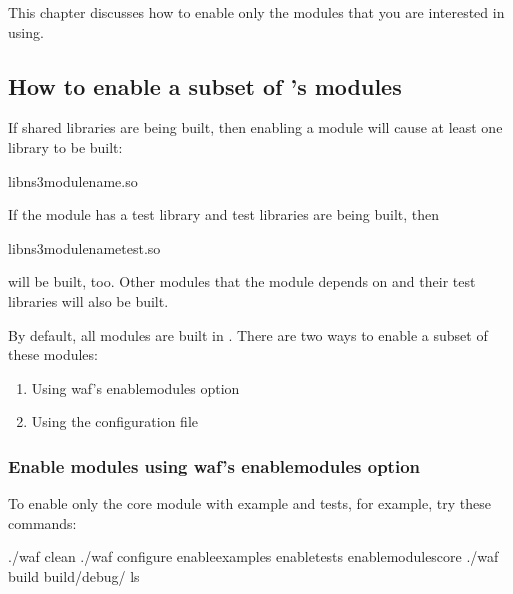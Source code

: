 \documentclass[letterpaper,10pt,english]{sphinxmanual}
\begin{document}
This chapter discusses how to enable only the  modules that you are interested in using.


\subsection{How to enable a subset of ’s modules}
\label{\detokenize{enable-modules:how-to-enable-a-subset-of-ns3-s-modules}}
If shared libraries are being built, then enabling a module will cause at least one library to be built:

\begin{sphinxVerbatim}[commandchars=\\\{\}]
libns3\PYGZhy{}modulename.so
\end{sphinxVerbatim}

If the module has a test library and test libraries are being built, then

\begin{sphinxVerbatim}[commandchars=\\\{\}]
libns3\PYGZhy{}modulename\PYGZhy{}test.so
\end{sphinxVerbatim}

will be built, too.  Other modules that the module depends on and their test libraries will also be built.

By default, all modules are built in .  There are two ways to enable a subset of these modules:
\begin{enumerate}
%
\item {} 
Using waf’s \textendash{}enable\sphinxhyphen{}modules option

\item {} 
Using the  configuration file

\end{enumerate}


\subsubsection{Enable modules using waf’s \textendash{}enable\sphinxhyphen{}modules option}
\label{\detokenize{enable-modules:enable-modules-using-waf-s-enable-modules-option}}
To enable only the core module with example and tests, for example,
try these commands:

\begin{sphinxVerbatim}[commandchars=\\\{\}]
\PYGZdl{} ./waf clean
\PYGZdl{} ./waf configure \PYGZhy{}\PYGZhy{}enable\PYGZhy{}examples \PYGZhy{}\PYGZhy{}enable\PYGZhy{}tests \PYGZhy{}\PYGZhy{}enable\PYGZhy{}modulescore
\PYGZdl{} ./waf build
\PYGZdl{}  build/debug/
\PYGZdl{} ls
\end{sphinxVerbatim}
\end{document}
